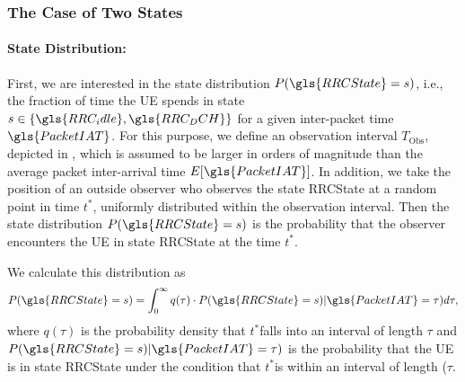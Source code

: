 \subsubsection*{The Case of Two  States}\label{sec:network:performance_model:system_description:two_states}

\newcommand{\RRCStateRealization}{\ensuremath{s}}
\newcommand{\ObservationInterval}{\ensuremath{T_{\text{Obs}}}}
\newcommand{\ObservationPoint}{\ensuremath{t^*}}
\newcommand{\ObservationIntervalDensity}{\ensuremath{q}}
\newcommand{\ObservationIntervalLength}{\ensuremath{\tau}}

\paragraph*{State Distribution:}
First, we are interested in the state distribution \(P(\gls{RRCState}=\RRCStateRealization)\), i.e., the fraction of time the \gls{UE} spends in state \(\RRCStateRealization\in\{\gls{RRC_idle},\gls{RRC_DCH}\}\) for a given inter-packet time \(\gls{PacketIAT}\).
For this purpose, we define an observation interval \ObservationInterval, depicted in , which is assumed to be larger in orders of magnitude than the average packet inter-arrival time \(E[\gls{PacketIAT}]\).
In addition, we take the position of an outside observer who observes the state \gls{RRCState} at a random point in time \(\ObservationPoint\), uniformly distributed within the observation interval. 
Then the state distribution \(P(\gls{RRCState}=\RRCStateRealization)\) is the probability that the observer encounters the \gls{UE} in state \gls{RRCState} at the time \ObservationPoint. 

We calculate this distribution as 
\begin{equation}
P(\gls{RRCState}=\RRCStateRealization)= 
  \int_{0}^\infty \ObservationIntervalDensity(\tau) \cdot 
  P(\gls{RRCState}=\RRCStateRealization) \vert \gls{PacketIAT} = \ObservationIntervalLength) d\ObservationIntervalLength ,
  \label{eq::statedistribution} 
\end{equation} 
where \(\ObservationIntervalDensity(\ObservationIntervalLength)\) is the probability density that \ObservationPoint falls into an interval of length \(\ObservationIntervalLength\) and \(P(\gls{RRCState}=\RRCStateRealization) \vert \gls{PacketIAT} = \ObservationIntervalLength)\) is the probability that the UE is in state \gls{RRCState} under the condition that \ObservationPoint is within an interval of length (\ObservationIntervalLength\).


